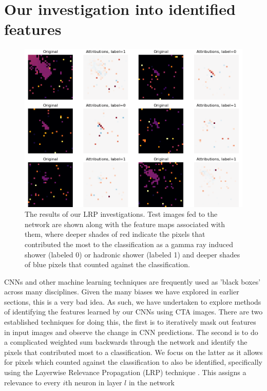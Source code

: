 \section{Our investigation into identified features}
\begin{figure}[ht] 
        \centering \includegraphics[width=1.0\columnwidth]{figures/lrp.png}

        \caption{
                \label{fig:lrp} %
                The results of our LRP investigations. Test images fed to the network are shown along with the feature maps associated with them, where deeper shades of red indicate the pixels that contributed the most to the classification as a gamma ray induced shower (labeled 0) or hadronic shower (labeled 1) and deeper shades of blue pixels that counted against the classification.  
        }
\end{figure}
CNNs and other machine learning techniques are frequently used as 'black boxes' across many disciplines. Given the many biases we have explored in earlier sections, this is a very bad idea. As such, we have undertaken to explore methods of identifying the features learned by our CNNs using CTA images. There are two established techniques for doing this, the first is to iteratively mask out features in input images and observe the change in CNN predictions. The second is to do a complicated weighted sum backwards through the network and identify the pixels that contributed most to a classification. We focus on the latter as it allows for pixels which counted against the classification to also be identified, specifically using the Layerwise Relevance Propagation (LRP) technique \cite{LRP}. This assigns a relevance to every $i$th neuron in layer $l$ in the network
